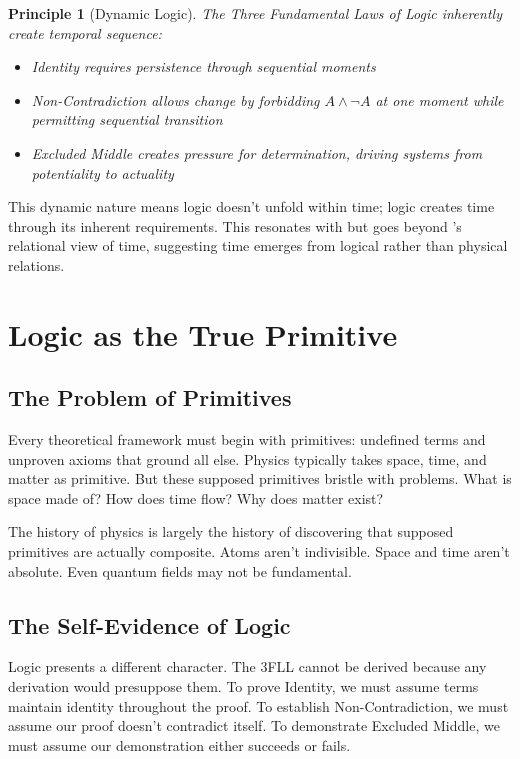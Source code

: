 \documentclass[12pt,a4paper]{article}
\newtheorem{principle}{Principle}
\begin{document}
\begin{principle}[Dynamic Logic]
The Three Fundamental Laws of Logic inherently create temporal sequence:
\begin{itemize}
\item Identity requires persistence through sequential moments
\item Non-Contradiction allows change by forbidding $A \land \neg A$ at one moment while permitting sequential transition
\item Excluded Middle creates pressure for determination, driving systems from potentiality to actuality
\end{itemize}
\end{principle}

This dynamic nature means logic doesn't unfold within time; logic creates time through its inherent requirements. This resonates with but goes beyond \citet{rovelli2018order}'s relational view of time, suggesting time emerges from logical rather than physical relations.

\section{Logic as the True Primitive}

\subsection{The Problem of Primitives}

Every theoretical framework must begin with primitives: undefined terms and unproven axioms that ground all else. Physics typically takes space, time, and matter as primitive. But these supposed primitives bristle with problems. What is space made of? How does time flow? Why does matter exist?

The history of physics is largely the history of discovering that supposed primitives are actually composite. Atoms aren't indivisible. Space and time aren't absolute. Even quantum fields may not be fundamental.

\subsection{The Self-Evidence of Logic}

Logic presents a different character. The 3FLL cannot be derived because any derivation would presuppose them. To prove Identity, we must assume terms maintain identity throughout the proof. To establish Non-Contradiction, we must assume our proof doesn't contradict itself. To demonstrate Excluded Middle, we must assume our demonstration either succeeds or fails.
\end{document}
